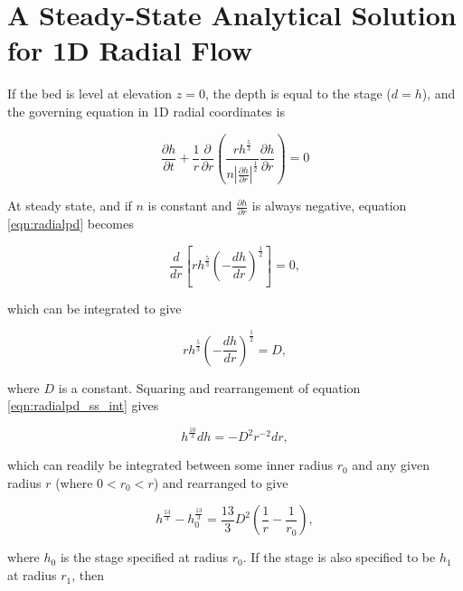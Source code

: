 \documentclass[fleqn]{article}
\author{MODFLOW Development Team}
\begin{document}
\section{A Steady-State Analytical Solution for 1D Radial Flow}

If the bed is level at elevation $z = 0$, the depth is equal to the stage ($d = h$), and the governing equation in 1D radial coordinates is

\begin{equation}
  \frac{\partial h}{\partial t}
  + \frac{1}{r} \frac{\partial}{\partial r}
  \left (
  \frac{r h^{\frac{5}{3}}}{n \left | \frac{\partial h}{\partial r} \right |^{\frac{1}{2}} } \frac{\partial h}{\partial r}
  \right )
  = 0
  \label{eqn:radialpd}
\end{equation}

\noindent At steady state, and if $n$ is constant and $\frac{\partial h}{\partial r}$ is always negative, equation \ref{eqn:radialpd} becomes

\begin{equation}
  \frac{d}{d r}
  \left [
  r h^{\frac{5}{3}} \left (-\frac{d h}{d r} \right )^{\frac{1}{2}}
  \right ]
  = 0
  \label{eqn:radialpd_ss} ,
\end{equation}

\noindent which can be integrated to give

\begin{equation}
  r h^{\frac{5}{3}} \left (-\frac{d h}{d r} \right )^{\frac{1}{2}}
  = D ,
  \label{eqn:radialpd_ss_int}
\end{equation}

\noindent where $D$ is a constant. Squaring and rearrangement of equation \ref{eqn:radialpd_ss_int} gives

\begin{equation}
  h^{\frac{10}{3}} d h = -D^{2} r^{-2} d r ,
  \label{eqn:radialpd_ss_int_alt}
\end{equation}

\noindent which can readily be integrated between some inner radius $r_{0}$ and any given radius $r$ (where $0 < r_{0} < r$) and rearranged to give

\begin{equation}
  h^{\frac{13}{3}} - h^{\frac{13}{3}}_{0} = \frac{13}{3} D^{2} \left(\frac{1}{r} - \frac{1}{r_{0}} \right ),
  \label{eqn:soln_ss_with_D}
\end{equation}

\noindent where $h_{0}$ is the stage specified at radius $r_{0}$. If the stage is also specified to be $h_{1}$ at radius $r_{1}$, then
\end{document}
